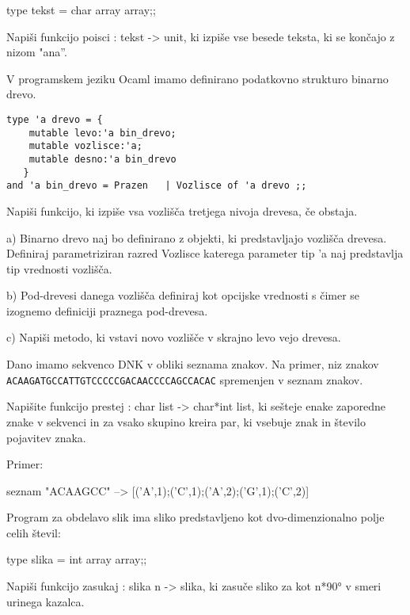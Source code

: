 \begin{ex}
type tekst = char array array;;

Napi\v si funkcijo poisci : tekst -> unit, ki izpi\v se vse besede teksta, ki se kon\v cajo z nizom "ana''. 


\end{ex} \begin{ex}
V programskem jeziku Ocaml imamo definirano podatkovno strukturo binarno drevo.

\begin{verbatim}
type 'a drevo = { 
    mutable levo:'a bin_drevo; 
    mutable vozlisce:'a; 
    mutable desno:'a bin_drevo 
   } 
and 'a bin_drevo = Prazen 	| Vozlisce of 'a drevo ;;

\end{verbatim}
Napi\v si funkcijo, ki izpi\v se vsa vozli\v s\v ca tretjega nivoja drevesa, \v ce obstaja.


\end{ex} \begin{ex}
a) Binarno drevo naj bo definirano z objekti, ki predstavljajo vozli\v s\v ca drevesa. Definiraj parametriziran razred Vozlisce katerega parameter tip 'a naj predstavlja tip vrednosti vozli\v s\v ca.  

b) Pod-drevesi danega vozli\v s\v ca definiraj kot opcijske vrednosti s \v cimer se izognemo definiciji praznega pod-drevesa. 

c) Napi\v si metodo, ki vstavi novo vozli\v s\v ce v skrajno levo vejo drevesa.



\end{ex} \begin{ex}
Dano imamo sekvenco DNK v obliki seznama znakov.  Na primer, niz znakov   \texttt{ACAAGATGCCATTGTCCCCCGACAACCCCAGCCACAC} spremenjen v seznam znakov. 

Napi\v site funkcijo prestej : char list -> char*int list, ki se\v steje enake zaporedne znake v sekvenci in za vsako skupino kreira par, ki vsebuje znak in \v stevilo pojavitev znaka.  

Primer:

seznam "ACAAGCC"  -->   [('A',1);('C',1);('A',2);('G',1);('C',2)]


\end{ex} \begin{ex}
Program za obdelavo slik ima sliko predstavljeno kot dvo-dimenzionalno polje celih \v stevil:  

type slika = int array array;;

Napi\v si funkcijo zasukaj : slika n -> slika, ki zasu\v ce sliko za kot n*90° v smeri urinega kazalca.  



\end{ex}
